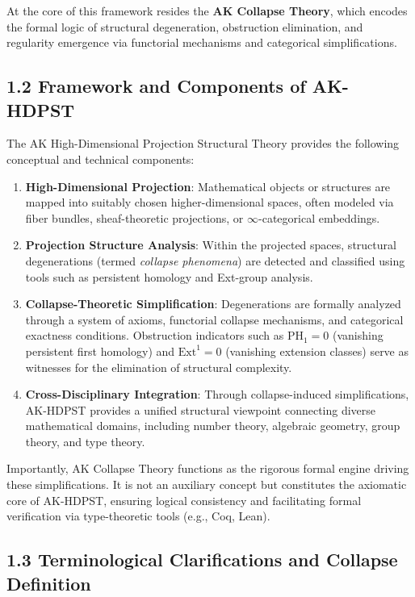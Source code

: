 \documentclass[11pt]{article}
\begin{document}
At the core of this framework resides the \textbf{AK Collapse Theory}, which encodes the formal logic of structural degeneration, obstruction elimination, and regularity emergence via functorial mechanisms and categorical simplifications.

\subsection*{1.2 Framework and Components of AK-HDPST}

The AK High-Dimensional Projection Structural Theory provides the following conceptual and technical components:

\begin{enumerate}
    \item \textbf{High-Dimensional Projection}: Mathematical objects or structures are mapped into suitably chosen higher-dimensional spaces, often modeled via fiber bundles, sheaf-theoretic projections, or $\infty$-categorical embeddings.

    \item \textbf{Projection Structure Analysis}: Within the projected spaces, structural degenerations (termed \textit{collapse phenomena}) are detected and classified using tools such as persistent homology and Ext-group analysis.

    \item \textbf{Collapse-Theoretic Simplification}: Degenerations are formally analyzed through a system of axioms, functorial collapse mechanisms, and categorical exactness conditions. Obstruction indicators such as $\mathrm{PH}_1 = 0$ (vanishing persistent first homology) and $\mathrm{Ext}^1 = 0$ (vanishing extension classes) serve as witnesses for the elimination of structural complexity.

    \item \textbf{Cross-Disciplinary Integration}: Through collapse-induced simplifications, AK-HDPST provides a unified structural viewpoint connecting diverse mathematical domains, including number theory, algebraic geometry, group theory, and type theory.
\end{enumerate}

Importantly, AK Collapse Theory functions as the rigorous formal engine driving these simplifications. It is not an auxiliary concept but constitutes the axiomatic core of AK-HDPST, ensuring logical consistency and facilitating formal verification via type-theoretic tools (e.g., Coq, Lean).

\subsection*{1.3 Terminological Clarifications and Collapse Definition}
\end{document}
